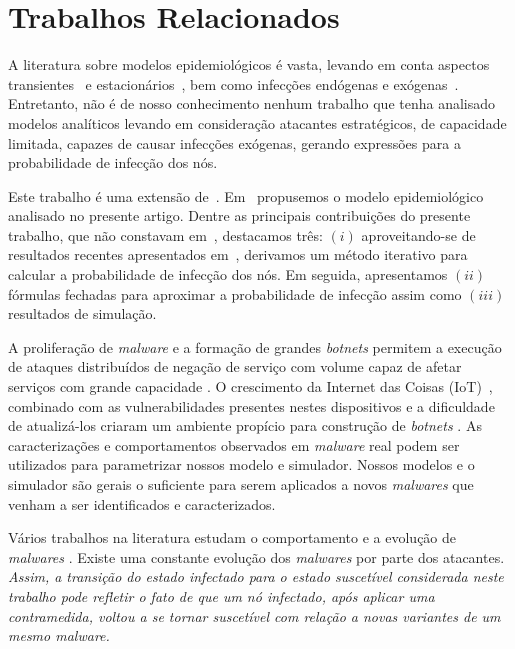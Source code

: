 
\chapter{Trabalhos Relacionados}
\label{cap:trab_relac}



A literatura sobre modelos epidemiológicos é vasta, levando em conta aspectos transientes~\cite{ganesh2005effect} e estacionários~\cite{keeling2005networks, ratton}, bem como infecções endógenas e exógenas~\cite{zhang2017contact,zhang2015Network,zhang2018more}. Entretanto, não é de nosso conhecimento nenhum trabalho  que tenha analisado modelos analíticos levando em consideração atacantes estratégicos, de capacidade limitada, capazes de causar infecções exógenas, gerando expressões para a probabilidade de infecção dos nós.


Este trabalho é uma extensão de~\cite{rufino2018contaminaccao}.  Em~\cite{rufino2018contaminaccao} propusemos o modelo epidemiológico analisado no presente artigo.  Dentre as principais contribuições do presente trabalho, que não constavam em~\cite{rufino2018contaminaccao}, destacamos três: $(i)$ aproveitando-se de resultados recentes apresentados em~\cite{zhang2018more}, derivamos um método iterativo  para calcular a probabilidade de infecção dos nós.  Em seguida, apresentamos $(ii)$   fórmulas fechadas para aproximar a probabilidade de infecção assim como   $(iii)$   resultados de simulação. 

A proliferação de \emph{malware} e a formação de grandes \emph{botnets} permitem a execução de ataques distribuídos de negação de serviço com volume capaz de afetar serviços com grande capacidade \cite{kolias2017ddos, dynddos}. O crescimento da Internet das Coisas (IoT)~\cite{peterson}, combinado com as vulnerabilidades presentes nestes dispositivos e a dificuldade de atualizá-los criaram um ambiente propício para construção de \emph{botnets} \cite{angrishi2017turning}.  
As caracterizações e comportamentos observados em \emph{malware} real podem ser utilizados para parametrizar nossos modelo e simulador. Nossos modelos e o simulador são gerais o suficiente para serem  aplicados a novos \emph{malwares} que venham a ser identificados e caracterizados.   


Vários trabalhos na literatura estudam o comportamento e a evolução de \emph{malwares} \cite{antonakakis2017understanding, marzano2018evolution}.  Existe uma  constante evolução dos \emph{malwares} por parte dos atacantes.  \emph{Assim, a transição do estado infectado para o estado  suscetível  considerada neste trabalho pode refletir o fato de que um nó infectado, após aplicar uma contramedida, voltou a se tornar suscetível com relação a novas variantes de um mesmo \emph{malware}.} 






